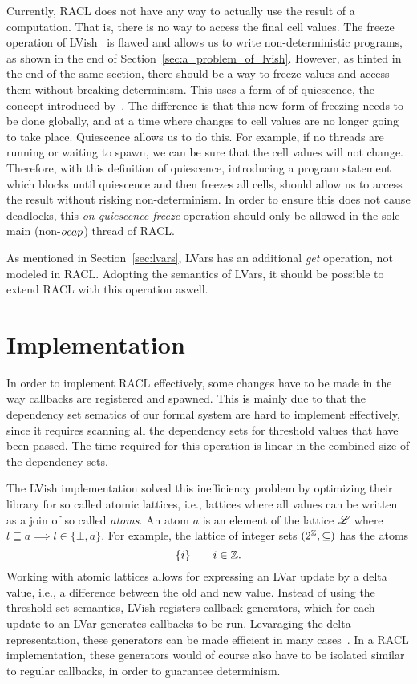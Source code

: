 Currently, RACL does not have any way to actually use the result of a
computation. That is, there is no way to access the final cell values. The
freeze operation of LVish~\parencite{kuper2014freeze} is flawed and allows us to
write non-deterministic programs, as shown in the end of
Section~\ref{sec:a_problem_of_lvish}. However, as hinted in the end of the same
section, there should be a way to freeze values and access them without breaking
determinism.  This uses a form of of quiescence, the concept introduced
by~\textcite{kuper2014freeze}. The difference is that this new form of freezing
needs to be done globally, and at a time where changes to cell values are no
longer going to take place. Quiescence allows us to do this. For example, if no
threads are running or waiting to spawn, we can be sure that the cell values
will not change. Therefore, with this definition of quiescence, introducing a
program statement which blocks until quiescence and then freezes all cells,
should allow us to access the result without risking non-determinism. In order
to ensure this does not cause deadlocks, this \emph{on-quiescence-freeze}
operation should only be allowed in the sole main (non-$\mbox{$ocap$}$) thread of RACL.

As mentioned in Section~\ref{sec:lvars}, LVars has an additional \emph{get}
operation, not modeled in RACL. Adopting the semantics of LVars, it should be
possible to extend RACL with this operation aswell.

\section{Implementation}%
\label{sec:implementation}

In order to implement RACL effectively, some changes have to be made in the way
callbacks are registered and spawned. This is mainly due to that the dependency
set sematics of our formal system are hard to implement effectively, since it
requires scanning all the dependency sets for threshold values that have been
passed. The time required for this operation is linear in the combined size of
the dependency sets.  

The LVish implementation solved this inefficiency problem by optimizing their
library for so called atomic lattices, i.e., lattices where all values can be
written as a join of so called \emph{atoms}. An atom $a$ is an element of the
lattice $\mbox{$\mathscr{L}$}$ where $l \sqsubseteq a \implies l \in \{\bot, a\}$. For
example, the lattice of integer sets $(2^{\mathbb{Z}}, \subseteq)$ has the atoms
\begin{equation*}
  \{ i \} \quad\quad i \in \mathbb{Z}.
\end{equation*}
Working with atomic lattices allows for expressing an LVar update by a delta
value, i.e., a difference between the old and new value. Instead of using the
threshold set semantics, LVish registers callback generators, which for each
update to an LVar generates callbacks to be run. Levaraging the delta
representation, these generators can be made efficient in many
cases~\parencite{kuper2014freeze}. In a RACL implementation, these generators
would of course also have to be isolated similar to regular callbacks, in
order to guarantee determinism.


